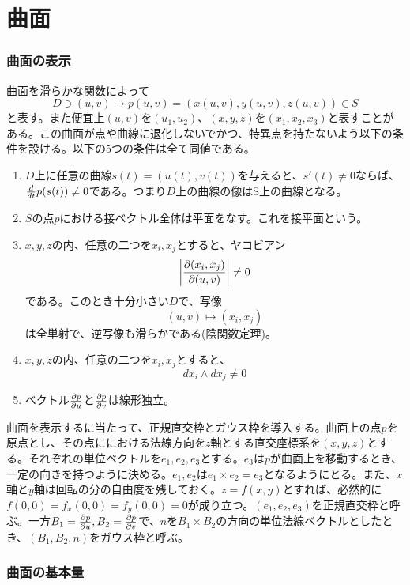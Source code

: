 \part{曲面}

\section{曲面の表示}
    曲面を滑らかな関数によって
        \[D \ni (u,v) \mapsto p(u,v) = (x(u,v), y(u,v), z(u,v)) \in S\]
    と表す。また便宜上$(u,v)$を$(u_1,u_2)$、$(x,y,z)$を$(x_1,x_2,x_3)$と表すことがある。この曲面が点や曲線に退化しないでかつ、特異点を持たないよう以下の条件を設ける。以下の5つの条件は全て同値である。
    \begin{enumerate}
        \item $D$上に任意の曲線$s(t) = (u(t),v(t))$を与えると、$s'(t) \neq 0$ならば、$\de{t}p(s(t)) \neq 0$である。つまり$D$上の曲線の像はS上の曲線となる。
        \item $S$の点$p$における接ベクトル全体は平面をなす。これを接平面という。
        \item $x,y,z$の内、任意の二つを$x_i,x_j$とすると、ヤコビアン
                  \[\left|\pd[(x_i,x_j)]{(u,v)}\right|\neq 0\]
              である。このとき十分小さい$D$で、写像
                  \[(u,v) \mapsto (x_i,x_j)\]
              は全単射で、逆写像も滑らかである(陰関数定理)。
        \item $x,y,z$の内、任意の二つを$x_i,x_j$とすると、
                  \[dx_i \wedge dx_j \neq 0\]
        \item ベクトル$\pd[p]{u}$と$\pd[p]{v}$は線形独立。
    \end{enumerate}
    曲面を表示するに当たって、正規直交枠とガウス枠を導入する。曲面上の点$p$を原点とし、その点ににおける法線方向を$z$軸とする直交座標系を$(x,y,z)$とする。それぞれの単位ベクトルを$e_1,e_2,e_3$とする。$e_3$は$p$が曲面上を移動するとき、一定の向きを持つように決める。$e_1,e_2$は$e_1 \times e_2 = e_3$となるようにとる。また、$x$軸と$y$軸は回転の分の自由度を残しておく。$z = f(x,y)$とすれば、必然的に$f(0,0) = f_x(0,0) = f_y(0,0) = 0$が成り立つ。$(e_1,e_2,e_3)$を正規直交枠と呼ぶ。一方$B_1 = \pd[p]{u}, B_2 = \pd[p]{v}$で、$n$を$B_1 \times B_2$の方向の単位法線ベクトルとしたとき、$(B_1,B_2,n)$をガウス枠と呼ぶ。

\section{曲面の基本量}
